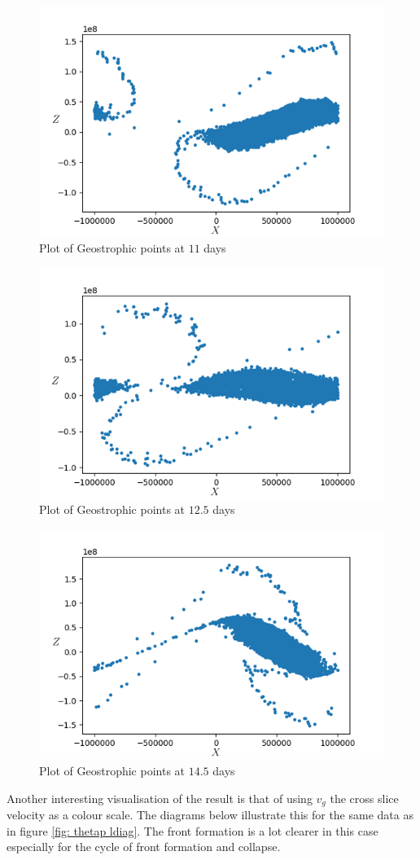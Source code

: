 \begin{figure}[ht!]
	\centering
	\includegraphics[width=0.6\linewidth]{evaluation/Gpoints_22}
	\caption{Plot of Geostrophic points at $11$ days}
	\label{Gpoints_front11}
\end{figure}
\begin{figure}
	\centering
	\includegraphics[width=0.6\linewidth]{evaluation/Gpoints_25}
	\caption{Plot of Geostrophic points at $12.5$ days}
	\label{Gpoints_front12.5}
\end{figure}
\begin{figure}
	\centering
	\includegraphics[width=0.6\linewidth]{evaluation/Gpoints_29}
	\caption{Plot of Geostrophic points at $14.5$ days}
	\label{Gpoints_front14.5}
\end{figure}

Another interesting visualisation of the result is that of using $v_g$ the cross slice velocity as a colour scale. The diagrams below illustrate this for the same data as in figure \ref{fig: thetap ldiag}. The front formation is a lot clearer in this case especially for the cycle of front formation and collapse.\\

